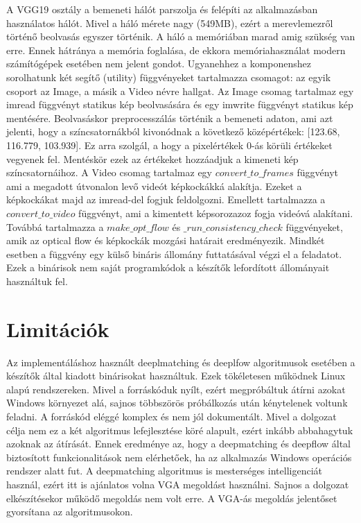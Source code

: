 \documentclass[12pt, a4paper, oneside]{book}
\theoremstyle{tetel}
\newcommand\secro[1]{%
	\addcontentsline{tce}{section}{\protect\makebox[2.8em][l]{\thesection.}#1}}
\newcommand\secen[1]{%
	 \addcontentsline{tcen}{section}{\protect\makebox[2.8em][l]{\thesection.}#1}}
\begin{document}
A VGG19 osztály a bemeneti hálót parszolja és felépíti az alkalmazásban használatos hálót. Mivel a háló mérete nagy (549MB), ezért a merevlemezről történő beolvasás egyszer történik. A háló a memóriában marad amig szükség van erre. Ennek hátránya a memória foglalása, de ekkora memóriahasználat modern számítógépek esetében nem jelent gondot.
\newline
\indent
Ugyanehhez a komponenshez sorolhatunk két segítő (utility) függvényeket tartalmazza csomagot: az egyik csoport az Image, a másik a Video névre hallgat.
\newline
\indent
Az Image csomag tartalmaz egy imread függvényt statikus kép beolvasására és egy imwrite függvényt statikus kép mentésére. Beolvasáskor preprocesszálás történik a bemeneti adaton, ami azt jelenti, hogy a színcsatornákból kivonódnak a következő középértékek: [123.68, 116.779, 103.939]. Ez arra szolgál, a hogy a pixelértékek 0-ás körüli értékeket vegyenek fel. Mentéskör ezek az értékeket hozzáadjuk a kimeneti kép színcsatornáihoz.
\newline
\indent
A Video csomag tartalmaz egy \(convert\_to\_frames\) függvényt ami a megadott útvonalon levő videót képkockákká alakítja. Ezeket a képkockákat majd az imread-del fogjuk feldolgozni. Emellett tartalmazza a \(convert\_to\_video\) függvényt, ami a kimentett képsorozazoz fogja videóvá alakítani. Továbbá tartalmazza a \(make\_opt\_flow\) és \(\_run\_consistency\_check\) függvényeket, amik az optical flow és képkockák mozgási határait eredményezik. Mindkét esetben a függvény egy külső bináris állomány futtatásával végzi el a feladatot. Ezek a binárisok nem saját programkódok a készítők lefordított állományait használtuk fel\cite{34}.

\section{Limitációk}
\secro{Limitații}
\secen{Limitations}
Az implementáláshoz használt deeplmatching és deeplfow algoritmusok esetében a készítők által kiadott binárisokat használtuk. Ezek tökéletesen működnek Linux alapú rendszereken. Mivel a forráskóduk nyílt, ezért megpróbáltuk átírni azokat Windows környezet alá, sajnos többszörös próbálkozás után kénytelenek voltunk feladni. A forráskód eléggé komplex és nem jól dokumentált. Mivel a dolgozat célja nem ez a két algoritmus lefejlesztése köré alapult, ezért inkább abbahagytuk azoknak az átírását. Ennek eredménye az, hogy a deepmatching és deepflow által biztosított funkcionalitások nem elérhetőek, ha az alkalmazás Windows operációs rendszer alatt fut.
\newline
\indent
A deepmatching algoritmus is mesterséges intelligenciát használ, ezért itt is ajánlatos volna VGA megoldást használni. Sajnos a dolgozat elkészítésekor működő megoldás nem volt erre. A VGA-ás megoldás jelentőset gyorsítana az algoritmusokon.
\end{document}
